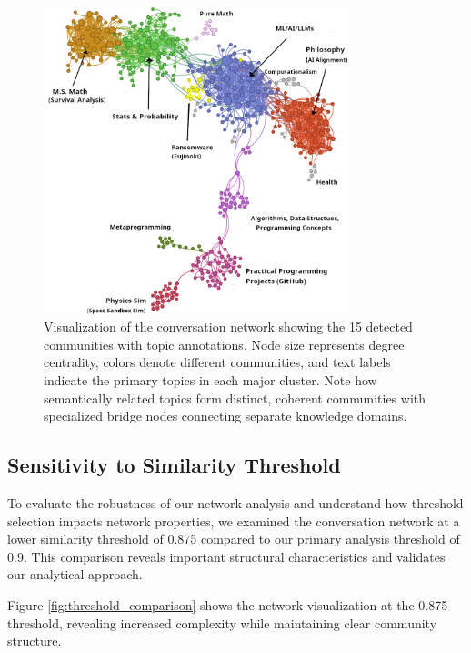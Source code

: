 \documentclass[10pt, a4paper]{article}
\begin{document}
\begin{figure}
    \centering
    \includegraphics[width=3.5in]{./images/cluster-vis-topics-better.png}
    \caption{Visualization of the conversation network showing the 15 detected communities with topic annotations. Node size represents degree centrality, colors denote different communities, and text labels indicate the primary topics in each major cluster. Note how semantically related topics form distinct, coherent communities with specialized bridge nodes connecting separate knowledge domains.}
    \label{fig:network_vis}
\end{figure}   


\subsection{Sensitivity to Similarity Threshold}

To evaluate the robustness of our network analysis and understand how threshold selection impacts network properties, we examined the conversation network at a lower similarity threshold of 0.875 compared to our primary analysis threshold of 0.9. This comparison reveals important structural characteristics and validates our analytical approach.

Figure \ref{fig:threshold_comparison} shows the network visualization at the 0.875 threshold, revealing increased complexity while maintaining clear community structure.
\end{document}
